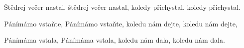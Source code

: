 \vskip-5mm
\IncludeLilypond

Štědrej večer nastal,
štědrej večer nastal,
koledy přichystal,
koledy přichystal.

Pánímámo vstaňte,
Pánímámo vstaňte,
koledu nám dejte,
koledu nám dejte,

Pánímáma vstala,
Pánímáma vstala,
koledu nám dala,
koledu nám dala.
